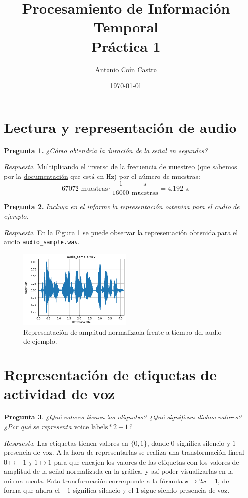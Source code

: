\documentclass[11pt]{article}
\author{Antonio Coín Castro}
\date{\today}
\title{Procesamiento de Información Temporal\\\Large{Práctica 1}}
\begin{document}
\maketitle

\section{Lectura y representación de audio}

\textbf{Pregunta 1.} \textit{¿Cómo obtendría la duración de la señal en segundos?}

\textit{Respuesta}. Multiplicando el inverso de la frecuencia de muestreo (que sabemos por la \href{https://docs.scipy.org/doc/scipy/reference/generated/scipy.io.wavfile.read.html}{documentación} que está en Hz) por el número de muestras:
$$
67072 \text{ muestras} \cdot \frac{1}{16000} \ \frac{\text{s}}{\text{muestras}} = 4.192 \text{ s}.
$$

\textbf{Pregunta 2.} \textit{Incluya en el informe la representación obtenida para el audio de ejemplo.}

\textit{Respuesta}. En la Figura \ref{fig:2_sample_audio} se puede observar la representación obtenida para el audio \texttt{audio\_sample.wav}.

\begin{figure}[h!]
  \centering
  \includegraphics[width=0.5\textwidth]{img/1_sample_signal}
  \caption{Representación de amplitud normalizada frente a tiempo del audio de ejemplo.}
  \label{fig:2_sample_audio}
\end{figure}

\section{Representación de etiquetas de actividad de voz}

\textbf{Pregunta 3}. \textit{¿Qué valores tienen las etiquetas? ¿Qué significan dichos valores? ¿Por qué se representa $\text{voice\_labels}\ast 2-1$?}

\textit{Respuesta}. Las etiquetas tienen valores en $\{0,1\}$, donde $0$ significa silencio y $1$ presencia de voz. A la hora de representarlas se realiza una transformación lineal $0\mapsto -1$ y $1\mapsto 1$ para que encajen los valores de las etiquetas con los valores de amplitud de la señal normalizada en la gráfica, y así poder visualizarlas en la misma escala. Esta transformación corresponde a la fórmula $x\mapsto 2x-1$, de forma que ahora el $-1$ significa silencio y el $1$ sigue siendo presencia de voz.
\end{document}
